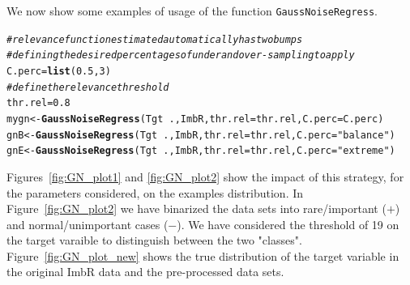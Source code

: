 \documentclass[10pt,a4paper]{article}\usepackage[]{graphicx}\usepackage[]{color}
\makeatletter
\newcommand{\hlnum}[1]{\textcolor[rgb]{0.686,0.059,0.569}{#1}}%
\newcommand{\hlstr}[1]{\textcolor[rgb]{0.192,0.494,0.8}{#1}}%
\newcommand{\hlcom}[1]{\textcolor[rgb]{0.678,0.584,0.686}{\textit{#1}}}%
\newcommand{\hlopt}[1]{\textcolor[rgb]{0,0,0}{#1}}%
\newcommand{\hlstd}[1]{\textcolor[rgb]{0.345,0.345,0.345}{#1}}%
\newcommand{\hlkwb}[1]{\textcolor[rgb]{0.69,0.353,0.396}{#1}}%
\newcommand{\hlkwc}[1]{\textcolor[rgb]{0.333,0.667,0.333}{#1}}%
\newcommand{\hlkwd}[1]{\textcolor[rgb]{0.737,0.353,0.396}{\textbf{#1}}}%
\newenvironment{kframe}{%
 \def\at@end@of@kframe{}%
 \ifinner\ifhmode%
  \def\at@end@of@kframe{\end{minipage}}%
  \begin{minipage}{\columnwidth}%
 \fi\fi%
 \def\FrameCommand##1{\hskip\@totalleftmargin \hskip-\fboxsep
 \colorbox{shadecolor}{##1}\hskip-\fboxsep
     \hskip-\linewidth \hskip-\@totalleftmargin \hskip\columnwidth}%
 \MakeFramed {\advance\hsize-\width
   \@totalleftmargin\z@ \linewidth\hsize
   \@setminipage}}%
 {\par\unskip\endMakeFramed%
 \at@end@of@kframe}
\newenvironment{knitrout}{}{} %
\makeatother
\begin{document}
We now show some examples of usage of the function \texttt{GaussNoiseRegress}.
\begin{knitrout}\footnotesize
{}\color{fgcolor}\begin{kframe}
\begin{alltt}
\hlcom{# relevance function estimated automatically has two bumps}
\hlcom{# defining the desired percentages of under and over-sampling to apply}
\hlstd{C.perc}\hlkwb{=}\hlkwd{list}\hlstd{(}\hlnum{0.5}\hlstd{,} \hlnum{3}\hlstd{)}
\hlcom{# define the relevance threshold}
\hlstd{thr.rel}\hlkwb{=}\hlnum{0.8}
\hlstd{mygn} \hlkwb{<-} \hlkwd{GaussNoiseRegress}\hlstd{(Tgt}\hlopt{~}\hlstd{., ImbR,} \hlkwc{thr.rel}\hlstd{=thr.rel,} \hlkwc{C.perc}\hlstd{=C.perc)}
\hlstd{gnB} \hlkwb{<-} \hlkwd{GaussNoiseRegress}\hlstd{(Tgt}\hlopt{~}\hlstd{., ImbR,} \hlkwc{thr.rel}\hlstd{=thr.rel,} \hlkwc{C.perc}\hlstd{=}\hlstr{"balance"}\hlstd{)}
\hlstd{gnE} \hlkwb{<-} \hlkwd{GaussNoiseRegress}\hlstd{(Tgt}\hlopt{~}\hlstd{., ImbR,} \hlkwc{thr.rel}\hlstd{=thr.rel,} \hlkwc{C.perc}\hlstd{=}\hlstr{"extreme"}\hlstd{)}
\end{alltt}
\end{kframe}
\end{knitrout}

Figures~\ref{fig:GN_plot1} and \ref{fig:GN_plot2} show the impact of this strategy, for the parameters considered, on the examples distribution. In Figure~\ref{fig:GN_plot2} we have binarized the data sets into rare/important ($+$) and normal/unimportant cases ($-$). We have considered the threshold of 19 on the target varaible to distinguish between the two "classes". Figure~\ref{fig:GN_plot_new} shows the true distribution of the target variable in the original ImbR data and the pre-processed data sets.
\end{document}
